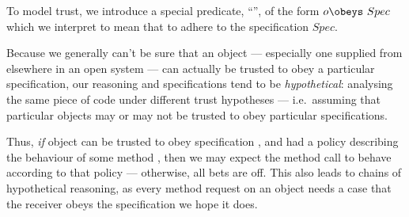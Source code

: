 
To model trust, we introduce a special predicate, ``\obeys'', of the
form $o \obeys\ Spec$  which we interpret to mean that 
 to adhere to the specification $Spec$.



%

Because we generally can't be sure that an object --- especially one
supplied from elsewhere in an open system --- can actually be trusted
to obey a particular specification, our reasoning and specifications
tend to be \textit{hypothetical}: analysing the same piece of code
under different trust hypotheses --- i.e.\
assuming that particular objects may or may not be trusted to
obey particular specifications.


Thus, {\em if}   object  can be trusted to obey specification , and    had a policy describing the behaviour of some method  , then we may expect the method call  to behave according to that policy --- otherwise, all bets are off.
This also leads to
chains of hypothetical reasoning, as every method request on an object
needs a case that the receiver obeys the specification we hope
it does.





